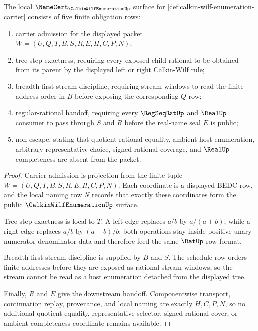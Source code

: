 \begin{theorem}
\label{thm:calkin-wilf-enumeration-namecert-obligations}
The local $\NameCert_{\CalkinWilfEnumerationUp}$ surface for
\autoref{def:calkin-wilf-enumeration-carrier} consists of five finite
obligation rows:
\begin{enumerate}
\item carrier admission for the displayed packet
$W=(U,Q,T,B,S,R,E,H,C,P,N)$;
\item tree-step exactness, requiring every exposed child rational to be
obtained from its parent by the displayed left or right Calkin-Wilf rule;
\item breadth-first stream discipline, requiring stream windows to read the
finite address order in $B$ before exposing the corresponding $Q$ row;
\item regular-rational handoff, requiring every $\RegSeqRatUp$ and $\RealUp$
consumer to pass through $S$ and $R$ before the real-name seal $E$ is public;
\item non-escape, stating that quotient rational equality, ambient host
enumeration, arbitrary representative choice, signed-rational coverage, and
$\RealUp$ completeness are absent from the packet.
\end{enumerate}
\end{theorem}
\begin{proof}
Carrier admission is projection from the finite tuple
$W=(U,Q,T,B,S,R,E,H,C,P,N)$. Each coordinate is a displayed BEDC row, and the
local naming row $N$ records that exactly these coordinates form the public
$\CalkinWilfEnumerationUp$ surface.

Tree-step exactness is local to $T$. A left edge replaces $a/b$ by
$a/(a+b)$, while a right edge replaces $a/b$ by $(a+b)/b$; both operations
stay inside positive unary numerator-denominator data and therefore feed the
same $\RatUp$ row format.

Breadth-first stream discipline is supplied by $B$ and $S$. The schedule row
orders finite addresses before they are exposed as rational-stream windows, so
the stream cannot be read as a host enumeration detached from the displayed
tree.

Finally, $R$ and $E$ give the downstream handoff. Componentwise transport,
continuation replay, provenance, and local naming are exactly $H,C,P,N$, so no
additional quotient equality, representative selector, signed-rational cover,
or ambient completeness coordinate remains available.
\end{proof}

